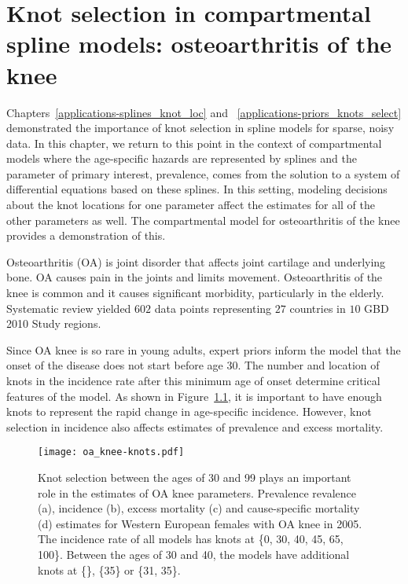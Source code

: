 \chapter{Knot selection in compartmental spline models: osteoarthritis of the knee}
\label{applications-con_fit_splines}

Chapters~\ref{applications-splines_knot_loc} and
~\ref{applications-priors_knots_select} demonstrated the importance of
knot selection in spline models for sparse, noisy data. In this
chapter, we return to this point in the context of compartmental
models where the age-specific hazards are represented by splines and
the parameter of primary interest, prevalence, comes from the solution
to a system of differential equations based on these splines. In this
setting, modeling decisions about the knot locations for one parameter
affect the estimates for all of the other parameters as well.  The
compartmental model for osteoarthritis of the knee provides a
demonstration of this.

Osteoarthritis (OA) is joint disorder that affects joint cartilage and
underlying bone.  OA causes pain in the joints and limits movement.
Osteoarthritis of the knee is common and it causes significant
morbidity, particularly in the
elderly. \cite{felson_epidemiology_1988, felson_incidence_1995}
Systematic review yielded $602$ data points representing $27$ countries
in $10$ GBD 2010 Study regions.

Since OA knee is so rare in young adults, expert priors inform the
model that the onset of the disease does not start before age 30.  The
number and location of knots in the incidence rate after this minimum
age of onset determine critical features of the model. As shown in
Figure~\ref{fig:app-oa knee knots}, it is important to have enough
knots to represent the rapid change in age-specific incidence.
However, knot selection in incidence also affects estimates of
prevalence and excess mortality.

    \begin{figure}[h]
        \begin{center}
            \texttt{[image: oa\_knee-knots.pdf]}
            \caption{Knot selection between the ages of 30 and 99
              plays an important role in the estimates of OA knee
              parameters.  Prevalence revalence (a), incidence (b),
              excess mortality (c) and cause-specific mortality (d)
              estimates for Western European females
              with OA knee in 2005.  The
              incidence rate of all models has knots at \{0, 30, 
              40, 45, 65, 100\}.  Between the ages
              of 30 and 40, the models have additional knots at \{\}, \{35\}
              or \{31, 35\}.}
            \label{fig:app-oa knee knots}
        \end{center}
    \end{figure}

